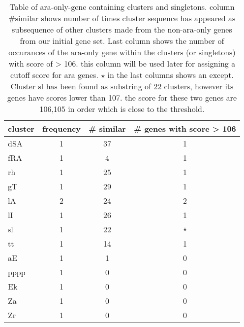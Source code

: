\documentclass[table,
12pt, %
a4paper, %
oneside, %
headinclude,footinclude, %
BCOR5mm, %
]{scrartcl}
\begin{document}
\begin{table}[htbp]
  \caption{Table of ara-only-gene containing clusters and singletons. column \#similar shows number of times cluster sequence has appeared as subsequence of other clusters made from the non-ara-only genes from our initial gene set. Last column shows the number of occurances of the ara-only gene within the clusters (or singletons) with score of > 106. this column will be used later for assigning a cutoff score for ara genes. $\star$ in the last columns shows an except. Cluster sl has been found as substring of 22 clusters, however its genes have scores lower than 107. the score for these two genes are 106,105 in order which is close to the threshold.}
  \begin{adjustbox}{center}
    \begin{tabular}{|l|c|c|c|}
      \hline
      cluster & frequency & \# similar & \# genes with score > 106 \\
      \hline\hline
      dSA     & 1         & 37         & 1                         \\
      fRA     & 1         & 4          & 1                         \\
      rh      & 1         & 25         & 1                         \\
      gT      & 1         & 29         & 1                         \\
      lA      & 2         & 24         & 2                         \\
      lI      & 1         & 26         & 1                         \\
      sl      & 1         & 22         & $\star$                   \\%
      tt      & 1         & 14         & 1                         \\
      \rowcolor{shadecolor}
      aE      & 1         & 1          & 0                         \\
      \rowcolor{lightgray}
      pppp    & 1         & 0          & 0                         \\
      \rowcolor{lightgray}
      Ek      & 1         & 0          & 0                         \\
      \rowcolor{lightgray}
      Za      & 1         & 0          & 0                         \\
      \rowcolor{lightgray}
      Zr      & 1         & 0          & 0                         \\

\end{tabular}
\end{adjustbox}
\end{table}
\end{document}
